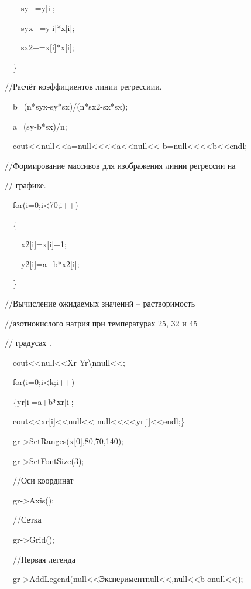 {\upshape
\ \ \ \ sy+=y[i];}

{\upshape
\ \ \ \ syx+=y[i]*x[i];}

{\upshape
\ \ \ \ sx2+=x[i]*x[i];}

{\upshape
\ \ \}}

{\upshape
//Расчёт коэффициентов линии регрессиии.}

{\upshape
\ \ b=(n*syx-sy*sx)/(n*sx2-sx*sx);}

{\upshape
\ \ a=(sy-b*sx)/n;}

{\upshape
\ \ cout{\textless}{\textless}null{<<}a=null{<<}{\textless}{\textless}a{\textless}{\textless}null{<<}
b=null{<<}{\textless}{\textless}b{\textless}{\textless}endl;}

{\upshape
//Формирование массивов для изображения линии регрессии на}

{\upshape
// графике.}

{\upshape
\ \ for(i=0;i{\textless}70;i++)}

{\upshape
\ \ \{}

{\upshape
\ \ \ \ x2[i]=x[i]+1;}

{\upshape
\ \ \ \ y2[i]=a+b*x2[i];}

{\upshape
\ \ \}}

{\upshape
//Вычисление ожидаемых значений – растворимость}

{\upshape
//азотнокислого натрия при температурах 25, 32 и 45}

{\upshape
// градусах .}

{\upshape
\ \ cout{\textless}{\textless}null{<<}Xr  Yr{\textbackslash}nnull{<<};}

{\upshape
\ \ for(i=0;i{\textless}k;i++)}

{\upshape
\ \ \{yr[i]=a+b*xr[i];}

{\upshape
\ \ cout{\textless}{\textless}xr[i]{\textless}{\textless}null{<<}
null{<<}{\textless}{\textless}yr[i]{\textless}{\textless}endl;\}}

{\upshape
\ \ gr-{\textgreater}SetRanges(x[0],80,70,140);\ \ }

{\upshape
\ \ gr-{\textgreater}SetFontSize(3);}

{\upshape
\ \ //Оси координат}

{\upshape
\ \ gr-{\textgreater}Axis();}

{\upshape
\ \ //Сетка}

{\upshape
\ \ gr-{\textgreater}Grid();}

{\upshape
\ \ //Первая легенда}

{\upshape
\ \ gr-{\textgreater}AddLegend(null{<<}Экспериментnull{<<},null{<<}b onull{<<});}

